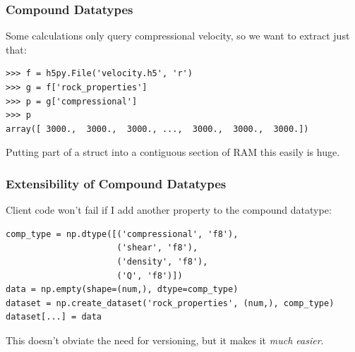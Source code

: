\documentclass[9pt]{beamer}
\begin{document}
\begin{frame}[fragile]
\frametitle{Compound Datatypes}
Some calculations only query compressional velocity, so we want to extract just that:
\begin{verbatim}
>>> f = h5py.File('velocity.h5', 'r')
>>> g = f['rock_properties']
>>> p = g['compressional']
>>> p
array([ 3000.,  3000.,  3000., ...,  3000.,  3000.,  3000.])
\end{verbatim}
Putting part of a struct into a contiguous section of RAM this easily is huge.
\end{frame}

\begin{frame}[fragile]
\frametitle{Extensibility of Compound Datatypes}
Client code won't fail if I add another property to the compound datatype:
\begin{verbatim}
comp_type = np.dtype([('compressional', 'f8'),
                      ('shear', 'f8'),
                      ('density', 'f8'),
                      ('Q', 'f8')])
data = np.empty(shape=(num,), dtype=comp_type) 
dataset = np.create_dataset('rock_properties', (num,), comp_type)
dataset[...] = data
\end{verbatim}
This doesn't obviate the need for versioning, but it makes it \emph{much easier}.
\end{frame}

\begin{frame}[fragile]

\end{frame}
\end{document}

